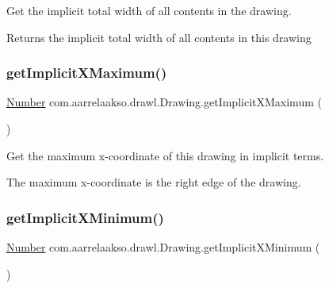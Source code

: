 Get the implicit total width of all contents in the drawing. 

\begin{DoxyReturn}{Returns}
the implicit total width of all contents in this drawing 
\end{DoxyReturn}
\mbox{\label{classcom_1_1aarrelaakso_1_1drawl_1_1_drawing_a5376328fce5b40696338490ab5b65bfe}} 
\subsubsection{\texorpdfstring{get\+Implicit\+X\+Maximum()}{getImplicitXMaximum()}}
{\footnotesize\ttfamily \hyperlink{interfacecom_1_1aarrelaakso_1_1drawl_1_1_number}{Number} com.\+aarrelaakso.\+drawl.\+Drawing.\+get\+Implicit\+X\+Maximum (\begin{DoxyParamCaption}{ }\end{DoxyParamCaption})\hspace{0.3cm}{\ttfamily [private]}}



Get the maximum x-\/coordinate of this drawing in implicit terms. 

The maximum x-\/coordinate is the right edge of the drawing. \mbox{\label{classcom_1_1aarrelaakso_1_1drawl_1_1_drawing_a481640a0219881863f0150b5f6439e38}} 
\subsubsection{\texorpdfstring{get\+Implicit\+X\+Minimum()}{getImplicitXMinimum()}}
{\footnotesize\ttfamily \hyperlink{interfacecom_1_1aarrelaakso_1_1drawl_1_1_number}{Number} com.\+aarrelaakso.\+drawl.\+Drawing.\+get\+Implicit\+X\+Minimum (\begin{DoxyParamCaption}{ }\end{DoxyParamCaption})\hspace{0.3cm}{\ttfamily [private]}}



